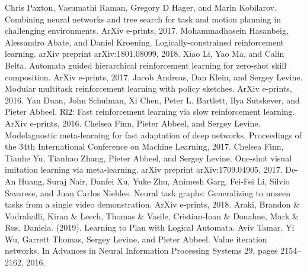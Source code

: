 \documentclass[letterpaper, 10 pt, conference]{ieeeconf}  %
\begin{document}
\begin{thebibliography}{99}


 Chris Paxton, Vasumathi Raman, Gregory D Hager, and Marin Kobilarov. Combining neural networks and tree search for task and motion planning in challenging environments. ArXiv e-prints, 2017.
 Mohammadhosein Hasanbeig, Alessandro Abate, and Daniel Kroening. Logically-constrained reinforcement learning. arXiv preprint arXiv:1801.08099, 2018.
 Xiao Li, Yao Ma, and Calin Belta. Automata guided hierarchical reinforcement learning for zero-shot skill composition. ArXiv e-prints, 2017.
 Jacob Andreas, Dan Klein, and Sergey Levine. Modular multitask reinforcement learning with policy sketches. ArXiv e-prints, 2016.
 Yan Duan, John Schulman, Xi Chen, Peter L. Bartlett, Ilya Sutskever, and Pieter Abbeel. Rl2: Fast reinforcement learning via slow reinforcement learning. ArXiv e-prints, 2016.
 Chelsea Finn, Pieter Abbeel, and Sergey Levine. Modelagnostic meta-learning for fast adaptation of deep networks. Proceedings of the 34th International Conference on Machine Learning, 2017.
 Chelsea Finn, Tianhe Yu, Tianhao Zhang, Pieter Abbeel, and Sergey Levine. One-shot visual imitation learning via meta-learning. arXiv preprint arXiv:1709.04905, 2017.
 De-An Huang, Suraj Nair, Danfei Xu, Yuke Zhu, Animesh Garg, Fei-Fei Li, Silvio Savarese, and Juan Carlos Niebles. Neural task graphs: Generalizing to unseen tasks from a single video demonstration. ArXiv e-prints, 2018.
 Araki, Brandon \& Vodrahalli, Kiran \& Leech, Thomas \& Vasile, Cristian-Ioan \& Donahue, Mark \& Rus, Daniela. (2019). Learning to Plan with Logical Automata.
 Aviv Tamar, Yi Wu, Garrett Thomas, Sergey Levine, and Pieter Abbeel. Value iteration networks. In Advances in Neural Information Processing Systems 29, pages 2154– 2162, 2016.


\end{thebibliography}
\end{document}
